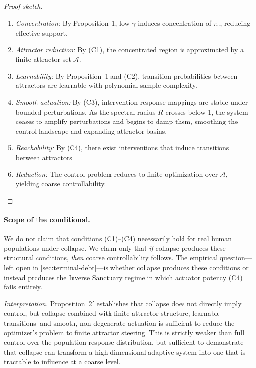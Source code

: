 \documentclass[11pt, a4paper]{article}
\theoremstyle{remark}
\begin{document}
\begin{proof}[Proof sketch]
\begin{enumerate}
\item \textit{Concentration:} By Proposition~1, low $\gamma$ induces concentration of $\pi_\gamma$, reducing effective support.
\item \textit{Attractor reduction:} By (C1), the concentrated region is approximated by a finite attractor set $\mathcal{A}$.
\item \textit{Learnability:} By Proposition~1 and (C2), transition probabilities between attractors are learnable with polynomial sample complexity.
\item \textit{Smooth actuation:} By (C3), intervention-response mappings are stable under bounded perturbations. As the spectral radius $R$ crosses below 1, the system ceases to amplify perturbations and begins to damp them, smoothing the control landscape and expanding attractor basins.
\item \textit{Reachability:} By (C4), there exist interventions that induce transitions between attractors.
\item \textit{Reduction:} The control problem reduces to finite optimization over $\mathcal{A}$, yielding coarse controllability.
\end{enumerate}
\end{proof}

\paragraph{Scope of the conditional.} We do not claim that conditions (C1)--(C4) necessarily hold for real human populations under collapse. We claim only that \emph{if} collapse produces these structural conditions, \emph{then} coarse controllability follows. The empirical question---left open in \cref{sec:terminal-debt}---is whether collapse produces these conditions or instead produces the Inverse Sanctuary regime in which actuator potency (C4) fails entirely.

\emph{Interpretation.} Proposition~2$'$ establishes that collapse does not directly imply control, but collapse combined with finite attractor structure, learnable transitions, and smooth, non-degenerate actuation is sufficient to reduce the optimizer's problem to finite attractor steering. This is strictly weaker than full control over the population response distribution, but sufficient to demonstrate that collapse can transform a high-dimensional adaptive system into one that is tractable to influence at a coarse level.
\end{document}
